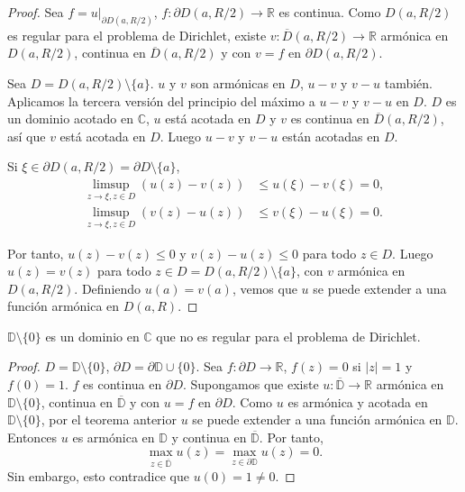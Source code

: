 \begin{proof}
    Sea $f = u|_{\partial D(a, R/2)}$, $f: \partial D(a, R/2) \to \mathbb{R}$ es continua.
    Como $D(a, R/2)$ es regular para el problema de Dirichlet, existe $v: \overline{D}(a, R/2) \to \mathbb{R}$ armónica en $D(a, R/2)$, continua en $\overline{D}(a, R/2)$ y con $v = f$ en $\partial D(a, R/2)$.

    Sea $D = D(a, R/2) \setminus \{a\}$.
    $u$ y $v$ son armónicas en $D$, $u-v$ y $v-u$ también.
    Aplicamos la tercera versión del principio del máximo a $u-v$ y $v-u$ en $D$.
    $D$ es un dominio acotado en $\mathbb{C}$, $u$ está acotada en $D$ y $v$ es continua en $\overline{D}(a, R/2)$, así que $v$ está acotada en $D$.
    Luego $u-v$ y $v-u$ están acotadas en $D$.

    Si $\xi \in \partial D(a, R/2) = \partial D \setminus \{a\}$,
    \begin{align*}
        \limsup_{z \to \xi, z \in D} (u(z) - v(z)) & \leq u(\xi) - v(\xi) = 0, \\
        \limsup_{z \to \xi, z \in D} (v(z) - u(z)) & \leq v(\xi) - u(\xi) = 0.
    \end{align*}

    Por tanto, $u(z) - v(z) \leq 0$ y $v(z) - u(z) \leq 0$ para todo $z \in D$.
    Luego $u(z) = v(z)$ para todo $z \in D = D(a, R/2) \setminus \{a\}$, con $v$ armónica en $D(a, R/2)$.
    Definiendo $u(a) = v(a)$, vemos que $u$ se puede extender a una función armónica en $D(a, R)$.
\end{proof}

\begin{theorem}
    $\mathbb{D} \setminus \{0\}$ es un dominio en $\mathbb{C}$ que no es regular para el problema de Dirichlet.
\end{theorem}

\begin{proof}
    $D = \mathbb{D} \setminus \{0\}$, $\partial D = \partial\mathbb{D} \cup \{0\}$.
    Sea $f: \partial D \to \mathbb{R}$, $f(z) = 0$ si $|z| = 1$ y $f(0) = 1$.
    $f$ es continua en $\partial D$.
    Supongamos que existe $u: \overline{\mathbb{D}} \to \mathbb{R}$ armónica en $\mathbb{D} \setminus \{0\}$, continua en $\overline{\mathbb{D}}$ y con $u = f$ en $\partial D$.
    Como $u$ es armónica y acotada en $\mathbb{D} \setminus \{0\}$, por el teorema anterior $u$ se puede extender a una función armónica en $\mathbb{D}$.
    Entonces $u$ es armónica en $\mathbb{D}$ y continua en $\overline{\mathbb{D}}$.
    Por tanto,
    $$\max_{z \in \overline{\mathbb{D}}} u(z) = \max_{z \in \partial\mathbb{D}} u(z) = 0.$$
    Sin embargo, esto contradice que $u(0) = 1 \neq 0$.
\end{proof}

